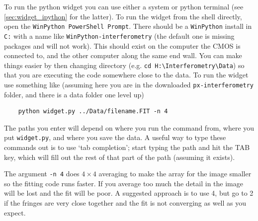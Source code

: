 \documentclass[11pt]{article}
\begin{document}
To run the python widget you can use either a system or python terminal (see \ref{sec:widget_ipython} for the latter). To run the widget from the shell directly, open the \texttt{WinPython PowerShell Prompt}. There should be a \texttt{WinPython} install in \texttt{C:} with a name like \texttt{WinPython-interferometry} (the default one is missing packages and will not work). This should exist on the computer the CMOS is connected to, and the other computer along the same end wall. You can make things easier by then changing directory (e.g. \texttt{cd H:\textbackslash Interferometry\textbackslash Data}) so that you are executing the code somewhere close to the data. To run the widget use something like (assuming here you are in the downloaded \texttt{px-interferometry} folder, and there is a data folder one level up)
\begin{verbatim}
    python widget.py ../Data/filename.FIT -n 4
\end{verbatim}
The paths you enter will depend on where you run the command from, where you put \texttt{widget.py}, and where you save the data. A useful way to type these commands out is to use `tab completion'; start typing the path and hit the TAB key, which will fill out the rest of that part of the path (assuming it exists).

The argument \texttt{-n 4} does $4 \times 4$ averaging to make the array for the image smaller so the fitting code runs faster. If you average too much the detail in the image will be lost and the fit will be poor. A suggested approach is to use 4, but go to 2 if the fringes are very close together and the fit is not converging as well as you expect.
\end{document}
